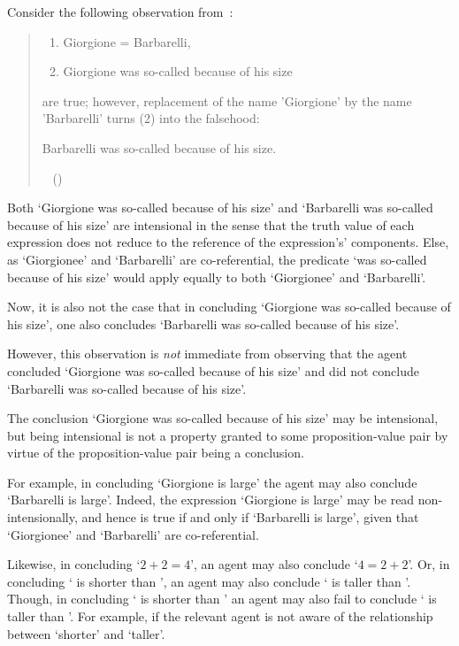 \begin{note}[Intensionality]
  Consider the following observation from~\citeauthor{Quine:1943vf}:

  \begin{quote}
    \begin{enumerate}[label=(\arabic*)]
    \item
      Giorgione = Barbarelli,
    \item
      Giorgione was so-called because of his size
    \end{enumerate}
    are true; however, replacement of the name 'Giorgione' by the name 'Barbarelli' turns (2) into the falsehood:

    \begin{center}
      Barbarelli was so-called because of his size.
    \end{center}
    \vspace{-\baselineskip}
    \mbox{ }%
    \mbox{}\hfill\mbox{(\Citeyear[113]{Quine:1943vf})}
  \end{quote}

  Both `Giorgione was so-called because of his size' and `Barbarelli was so-called because of his size' are intensional in the sense that the truth value of each expression does not reduce to the reference of the expression's' components.
  Else, as `Giorgionee' and `Barbarelli' are co-referential, the predicate `was so-called because of his size' would apply equally to both `Giorgionee' and `Barbarelli'.

  Now, it is also not the case that in concluding `Giorgione was so-called because of his size', one also concludes `Barbarelli was so-called because of his size'.

  However, this observation is \emph{not} immediate from observing that the agent concluded `Giorgione was so-called because of his size' and did not conclude `Barbarelli was so-called because of his size'.

  The conclusion `Giorgione was so-called because of his size' may be intensional, but being intensional is not a property granted to some proposition-value pair by virtue of the proposition-value pair being a conclusion.

  For example, in concluding `Giorgione is large' the agent may also conclude `Barbarelli is large'.
  Indeed, the expression `Giorgione is large' may be read non-intensionally, and hence is true if and only if `Barbarelli is large', given that `Giorgionee' and `Barbarelli' are co-referential.

  Likewise, in concluding `\(2 + 2 = 4\)', an agent may also conclude `\(4 = 2 + 2\)'.
  Or, in concluding ` is shorter than ', an agent may also conclude ` is taller than '.
  Though, in concluding ` is shorter than ' an agent may also fail to conclude ` is taller than '.
  For example, if the relevant agent is not aware of the relationship between `shorter' and `taller'.
\end{note}

